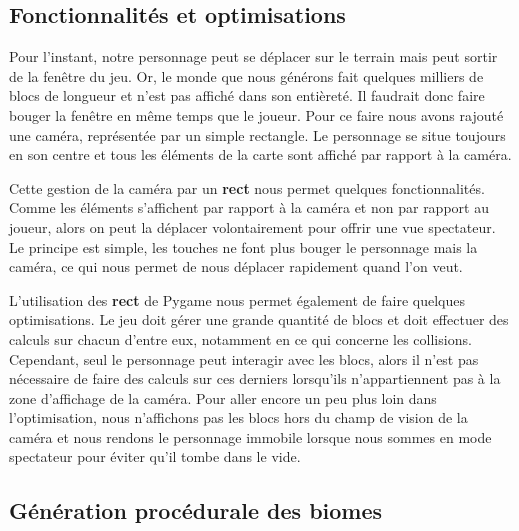 \documentclass[12pt]{article}
\begin{document}
\subsection{Fonctionnalités et optimisations}

Pour l'instant, notre personnage peut se déplacer sur le terrain mais peut sortir de la fenêtre du jeu. Or, le monde que nous générons fait quelques milliers de blocs de longueur et n'est pas affiché dans son entièreté. Il faudrait donc faire bouger la fenêtre en même temps que le joueur. Pour ce faire nous avons rajouté une caméra, représentée par un simple rectangle. Le personnage se situe toujours en son centre et tous les éléments de la carte sont affiché par rapport à la caméra.\par
\vspace{1cm}
Cette gestion de la caméra par un \textbf{rect} nous permet quelques fonctionnalités. Comme les éléments s'affichent par rapport à la caméra et non par rapport au joueur, alors on peut la déplacer volontairement pour offrir une vue spectateur. Le principe est simple, les touches ne font plus bouger le personnage mais la caméra, ce qui nous permet de nous déplacer rapidement quand l'on veut.\par 
L'utilisation des \textbf{rect} de Pygame nous permet également de faire quelques optimisations. Le jeu doit gérer une grande quantité de blocs et doit effectuer des calculs sur chacun d'entre eux, notamment en ce qui concerne les collisions. Cependant, seul le personnage peut interagir avec les blocs, alors il n'est pas nécessaire de faire des calculs sur ces derniers lorsqu'ils n'appartiennent pas à la zone d'affichage de la caméra. Pour aller encore un peu plus loin dans l'optimisation, nous n'affichons pas les blocs hors du champ de vision de la caméra et nous rendons le personnage immobile lorsque nous sommes en mode spectateur pour éviter qu'il tombe dans le vide.
\vspace{1cm}
\subsection{Génération procédurale des biomes}
\end{document}
